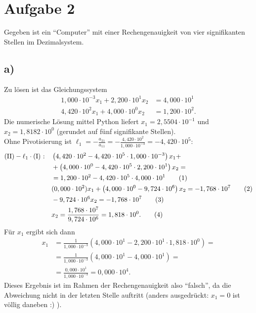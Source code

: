 \documentclass[english, parskip=full]{scrartcl}
\newcommand\numberthis{\addtocounter{equation}{1}\tag{\theequation}}
\newcommand{\kla}{}
\newcommand{\tecxt}{}
\begin{document}
\newpage
\section*{Aufgabe 2}
Gegeben ist ein ``Computer'' mit einer Rechengenauigkeit von vier signifikanten Stellen im Dezimalsystem.
\subsection*{a)}
Zu lösen ist das Gleichungssystem
\begin{align}
1,000\cdot 10^{-3} x_1 + 2,200\cdot 10^1 x_2 &= 4,000\cdot 10^1 \\
4,420\cdot 10^2 x_1 + 4,000\cdot 10^0 x_2 &= 1,200\cdot 10^2.
\end{align}
Die numerische Lösung mittel Python liefert $x_1 = 2,5504\cdot 10^{-1}$ und $x_2 = 1,8182\cdot 10^0$ (gerundet auf fünf signifikante Stellen).
\\
Ohne Pivotisierung ist $\ell_1 = -\frac{a_{21}}{a_{11}} = -\frac{4,420\cdot 10^2}{1,000\cdot 10^{-3}} = -4,420\cdot 10^5$:
\begin{align*}
\tecxt\text{(II)} - \ell_1\cdot \tecxt\text{(I)   :} \ \ \  &\kla\left( 4,420\cdot 10^2 - 4,420\cdot 10^5 \cdot 1,000\cdot 10^{-3} \right)x_1 + \\
& + \kla\left( 4,000\cdot 10^0 -  4,420\cdot 10^5\cdot 2,200\cdot 10^1 \right)x_2 = \\
&= 1,200\cdot 10^2 - 4,420\cdot 10^5\cdot 4,000\cdot 10^1 \numberthis\\
& (0,000\cdot 10^2)x_1 + \kla\left( 4,000\cdot 10^0 - 9,724\cdot 10^6 \right)x_2 = -1,768\cdot 10^7 \numberthis \\
& -9,724\cdot 10^6 x_2 = -1,768\cdot 10^7 \numberthis \\
& x_2 = \frac{1,768\cdot 10^7}{9,724\cdot 10^6} = 1,818 \cdot 10^0. \numberthis
\end{align*}
Für $x_1$ ergibt sich dann
\begin{align}
x_1 &= \frac{1}{1,000\cdot 10^{-3}}\kla\left( 4,000\cdot 10^1 - 2,200\cdot 10^1 \cdot 1,818\cdot 10^0 \right) = \\
&= \frac{1}{1,000\cdot 10^{-3}}\kla\left( 4,000\cdot 10^1 - 4,000\cdot 10^1 \right) = \\
&=\frac{0,000\cdot 10^1}{1,000\cdot 10^{-3}} = 0,000\cdot 10^4.
\end{align}
Dieses Ergebnis ist im Rahmen der Rechengenauigkeit also ``falsch'', da die Abweichung nicht in der letzten Stelle auftritt (anders ausgedrückt: $x_1=0$ ist völlig daneben :) ). 
\end{document}

